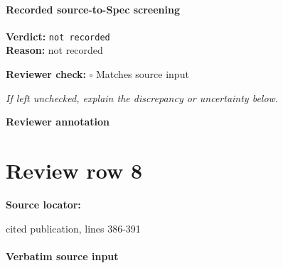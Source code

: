 \documentclass[10pt]{article}
\newcommand{\reviewerbox}{%
  \par\noindent\fbox{\parbox{0.96\linewidth}{\rule{0pt}{0.38in}}}\par
}
\newcommand{\reviewmatch}[1]{%
  \par\noindent\textbf{Reviewer check:} $\square$\; #1\par
  \noindent\emph{If left unchecked, explain the discrepancy or uncertainty below.}\par
}
\begin{document}
\paragraph{Recorded source-to-Spec screening}
\textbf{Verdict:} \texttt{not recorded}
\\
\textbf{Reason:} not recorded
\reviewmatch{Matches source input}
\noindent\textbf{Reviewer annotation}\par
\reviewerbox
\clearpage
\hypertarget{source-claim-80ef2800a9578ca5}{}
\section*{Review row 8}
\textbf{Source locator:} {\footnotesize\raggedright cited publication, lines 386-\allowbreak{}391\par}
\paragraph{Verbatim source input}
\end{document}

